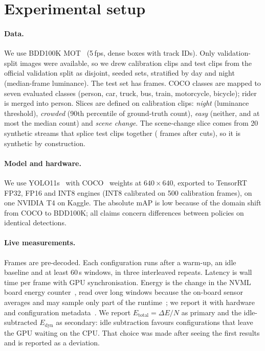 \documentclass[pdflatex,sn-mathphys-num]{sn-jnl}
\begin{document}
\section{Experimental setup}\label{sec:setup}
\paragraph{Data.} We use BDD100K MOT~\cite{yu2020bdd100k} (5\,fps, dense boxes with track IDs). Only validation-split images were available, so we drew \CalibClips{} calibration clips and \TestClips{} test clips from the official validation split as disjoint, seeded sets, stratified by day and night (median-frame luminance). The test set has \TestFrames{} frames. COCO classes are mapped to seven evaluated classes (person, car, truck, bus, train, motorcycle, bicycle); rider is merged into person. Slices are defined on calibration clips: \emph{night} (luminance threshold), \emph{crowded} (90th percentile of ground-truth count), \emph{easy} (neither, and at most the median count) and \emph{scene change}. The scene-change slice comes from 20 synthetic streams that splice test clips together (\SceneChangeFrames{} frames after cuts), so it is synthetic by construction.

\paragraph{Model and hardware.} We use YOLO11s~\cite{jocher2024yolo11} with COCO~\cite{lin2014coco} weights at $640 \times 640$, exported to TensorRT~\cite{nvidia_tensorrt_docs} FP32, FP16 and INT8 engines (INT8 calibrated on 500 calibration frames), on one NVIDIA T4 on Kaggle. The absolute mAP is low because of the domain shift from COCO to BDD100K; all claims concern differences between policies on identical detections.

\paragraph{Live measurements.} Frames are pre-decoded. Each configuration runs after a warm-up, an idle baseline and at least 60\,s windows, in three interleaved repeats. Latency is wall time per frame with GPU synchronisation. Energy is the change in the NVML board energy counter~\cite{nvidia_nvml_api}, read over long windows because the on-board sensor averages and may sample only part of the runtime~\cite{yang2024gpupower}; we report it with hardware and configuration metadata~\cite{henderson2020energy}. We report $E_{\text{total}} = \Delta E/N$ as primary and the idle-subtracted $E_{\text{dyn}}$ as secondary: idle subtraction favours configurations that leave the GPU waiting on the CPU. That choice was made after seeing the first results and is reported as a deviation.
\end{document}
